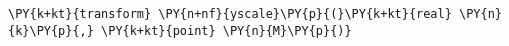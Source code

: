 \begin{Verbatim}[commandchars=\\\{\}]
    \PY{k+kt}{transform} \PY{n+nf}{yscale}\PY{p}{(}\PY{k+kt}{real} \PY{n}{k}\PY{p}{,} \PY{k+kt}{point} \PY{n}{M}\PY{p}{)}
\end{Verbatim}
